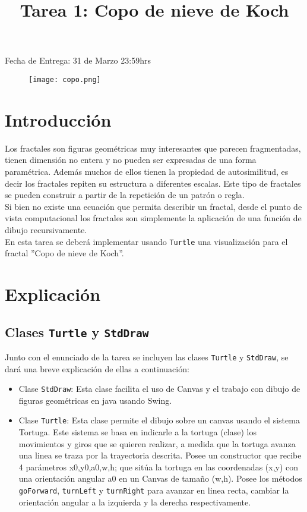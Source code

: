 \documentclass[dcc]{fcfmcourse}
\title{Tarea 1: Copo de nieve de Koch}
\begin{document}
\maketitle
\vspace{-2ex}
\begin{center}
Fecha de Entrega: 31 de Marzo 23:59hrs
\end{center}

\begin{figure}[h!]
    \centering
    \texttt{[image: copo.png]}
\end{figure}

\section{Introducción}
Los fractales son figuras geométricas muy interesantes que parecen fragmentadas, tienen dimensión no entera y no pueden ser expresadas de una forma paramétrica. Además muchos de ellos tienen la propiedad de autosimilitud, es decir los fractales repiten su estructura a diferentes escalas. Este tipo de fractales se pueden construir a partir de la repetición de un patrón o regla. \\

Si bien no existe una ecuación que permita describir un fractal, desde el punto de vista computacional los fractales son simplemente la aplicación de una función de dibujo recursivamente. \\

En esta tarea se deberá implementar usando \texttt{Turtle} una visualización para el fractal ''Copo de nieve de Koch''.

\section{Explicación}

\subsection{Clases \texttt{Turtle} y \texttt{StdDraw}}
Junto con el enunciado de la tarea se incluyen las clases \texttt{Turtle} y \texttt{StdDraw}, se dará una breve explicación de ellas a continuación:

\begin{itemize}
    \item Clase \texttt{StdDraw}: Esta clase facilita el uso de Canvas y el trabajo con dibujo de figuras geométricas en java usando Swing.
    \item Clase \texttt{Turtle}: Esta clase permite el dibujo sobre un canvas usando el sistema Tortuga. Este sistema se basa en indicarle a la tortuga (clase) los movimientos y giros que se quieren realizar, a medida que la tortuga avanza una linea se traza por la trayectoria descrita. Posee un constructor que recibe 4 parámetros x0,y0,a0,w,h; que sitúa la tortuga en las coordenadas (x,y) con una orientación angular a0 en un Canvas de tamaño (w,h). Posee los métodos \texttt{goForward}, \texttt{turnLeft} y \texttt{turnRight} para avanzar en linea recta, cambiar la orientación angular a la izquierda y la derecha respectivamente.
\end{itemize}
\end{document}

